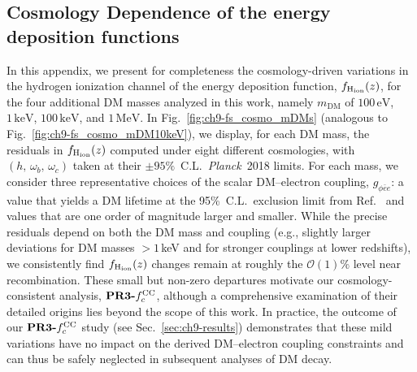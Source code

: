 \begin{subappendices}

\section{Cosmology Dependence of the energy deposition functions}
\label{sec:ch9-app_fs_cosmo}

In this appendix, we present for completeness the cosmology-driven variations in the hydrogen ionization channel of the energy deposition function, $f_{\rm H_{ion}}(z)$, for the four additional DM masses analyzed in this work, namely $m_{\mathrm{DM}}$ of $100\,\mathrm{eV}$, $1\,\mathrm{keV}$, $100\,\mathrm{keV}$, and $1\,\mathrm{MeV}$. In Fig.~\ref{fig:ch9-fs_cosmo_mDMs} (analogous to Fig.~\ref{fig:ch9-fs_cosmo_mDM10keV}), we display, for each DM mass, the residuals in $f_{\rm H_{ion}}(z)$ computed under eight different cosmologies, with $(h,\,\omega_b,\,\omega_c)$ taken at their $\pm 95\%$~C.L.\ \textit{Planck}~2018 limits. For each mass, we consider three representative choices of the scalar DM--electron coupling, $g_{\phi \bar{e}e}$: a value that yields a DM lifetime at the 95\%~C.L.\ exclusion limit from Ref.~\cite{2024arXiv240813305X} and values that are one order of magnitude larger and smaller. While the precise residuals depend on both the DM mass and coupling (e.g., slightly larger deviations for DM masses $>1\,$keV and for stronger couplings at lower redshifts), we consistently find $f_{\rm H_{ion}}(z)$ changes remain at roughly the $\mathcal{O}(1)\%$ level near recombination.
These small but non-zero departures motivate our cosmology-consistent analysis, $\textbf{PR3-}f^{\rm CC}_c$, although a comprehensive examination of their detailed origins lies beyond the scope of this work. In practice, the outcome of our $\textbf{PR3-}f^{\rm CC}_c$ study (see Sec.~\ref{sec:ch9-results}) demonstrates that these mild variations have no impact on the derived DM--electron coupling constraints and can thus be safely neglected in subsequent analyses of DM decay.


\end{subappendices}
